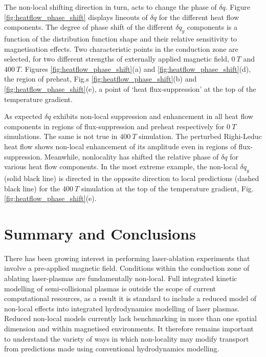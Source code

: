\documentclass[aip,reprint]{revtex4-1}
\begin{document}
The non-local shifting direction in turn, acts to change the phase of $\delta q$. Figure \ref{fig:heatflow_phase_shift} displays lineouts of $\delta q$ for the different heat flow components. The degree of phase shift of the different $\delta q_y$ components is a function of the distribution function shape and their relative sensitivity to magnetisation effects.  Two characteristic points in the conduction zone are selected, for two different strengths of externally applied magnetic field, $\SI{0}{T}$ and $\SI{400}{T}$. Figures \ref{fig:heatflow_phase_shift}(a) and \ref{fig:heatflow_phase_shift}(d), the region of preheat, Fig.s \ref{fig:heatflow_phase_shift}(b) and \ref{fig:heatflow_phase_shift}(e), a point of `heat flux-suppression' at the top of the temperature gradient. 

As expected $\delta q$ exhibits non-local suppression and enhancement in all heat flow components in regions of flux-suppression and preheat respectively for $\SI{0}{T}$ simulations. The same is not true in $\SI{400}{T}$ simulation.  
The perturbed Righi-Leduc heat flow shows non-local enhancement of its amplitude even in regions of flux-suppression.  Meanwhile, nonlocality has shifted the relative phase of $\delta q$ for various heat flow components. In the most extreme example, the non-local $\delta q_y$ (solid black line) is directed in the opposite direction to local predictions (dashed black line) for the $\SI{400}{T}$ simulation at the top of the temperature gradient, Fig. \ref{fig:heatflow_phase_shift}(e).







\section{Summary and Conclusions}
There has been growing interest in performing laser-ablation experiments that involve a pre-applied magnetic field. Conditions within the conduction zone of ablating laser-plasmas are fundamentally non-local. Full integrated kinetic modelling of semi-collisional plasmas is outside the scope of current computational resources, as a result it is standard to include a reduced model of non-local effects into integrated hydrodynamics modelling of laser plasmas. Reduced non-local models currently lack benchmarking in more than one spatial dimension and within magnetised environments. It therefore remains important to understand the variety of ways in which non-locality may modify transport from predictions made using conventional hydrodynamics modelling.
\end{document}
